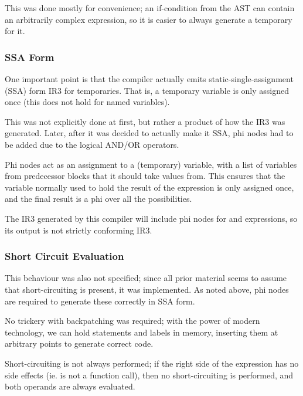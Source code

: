 \documentclass[12pt]{article}
\begin{document}
This was done mostly for convenience; an if-condition from the AST can contain an arbitrarily complex expression, so it is
easier to always generate a temporary for it.


\subsubsection{SSA Form}

One important point is that the compiler actually emits static-single-assignment (SSA) form IR3 for temporaries. That is,
a temporary variable is only assigned once (this does not hold for named variables).

This was not explicitly done at first, but rather a product of how the IR3 was generated. Later, after it was decided to
actually make it SSA, phi nodes had to be added due to the logical AND/OR operators.

Phi nodes act as an assignment to a (temporary) variable, with a list of variables from predecessor blocks that it should
take values from. This ensures that the variable normally used to hold the result of the expression is only assigned
once, and the final result is a phi over all the possibilities.

The IR3 generated by this compiler will include phi nodes for \eqtt{\&\&} and \eqtt{||} expressions, so its output
is not strictly conforming IR3.




\subsubsection{Short Circuit Evaluation}

This behaviour was also not specified; since all prior material seems to assume that short-circuiting is present, it was
implemented. As noted above, phi nodes are required to generate these correctly in SSA form.

No trickery with backpatching was required; with the power of modern technology, we can hold statements and labels in memory,
inserting them at arbitrary points to generate correct code.

Short-circuiting is not always performed; if the right side of the expression has no side effects (ie. is not a function
call), then no short-circuiting is performed, and both operands are always evaluated.

\end{document}
